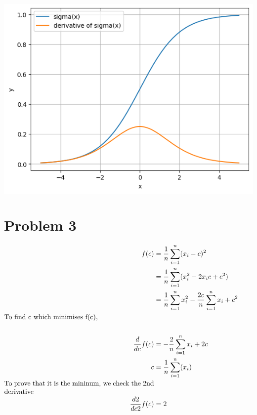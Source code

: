\documentclass[12pt]{article}
\begin{document}
\includegraphics[width=\textwidth]{question2.png}

\newpage

\section*{Problem 3}

\begin{center}
    $
        \begin{alignedat}{2}
            f(c)                 & = \frac{1}{n} \sum_{i=1}^{n} (x_i - c)^2                                   \\
                                 & = \frac{1}{n} \sum_{i=1}^{n} (x_i^2 -2x_i c + c^2)                         \\
                                 & = \frac{1}{n} \sum_{i=1}^{n} x_i^2 - \frac{2c}{n} \sum_{i=1}^{n} x_i + c^2 \\
            \parbox{3in}{To find c which minimises f(c),}                                                     \\                                                                    \\
            \frac{d }{dc} f(c)   & = - \frac{2}{n} \sum_{i=1}^{n} x_i + 2c                                    \\
            c                    & = \frac{1}{n} \sum_{i=1}^{n}(x_i)                                          \\
            \parbox{3in}{To prove that it is the mininum, we check the 2nd derivative}                        \\
            \frac{d2 }{dc2} f(c) & = 2
        \end{alignedat}
    $
\end{center}
\end{document}
